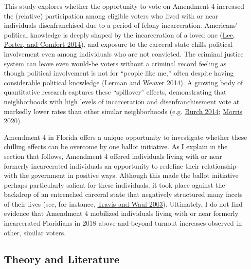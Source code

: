\documentclass[
  12pt,
]{article}
\begin{document}
This study explores whether the opportunity to vote on Amendment 4 increased the (relative) participation among eligible voters who lived with or near individuals disenfranchised due to a period of felony incarceration. Americans' political knowledge is deeply shaped by the incarceration of a loved one (\protect\hyperlink{ref-Lee2014}{Lee, Porter, and Comfort 2014}), and exposure to the carceral state chills political involvement even among individuals who are not convicted. The criminal justice system can leave even would-be voters without a criminal record feeling as though political involvement is not for ``people like me,'' often despite having considerable political knowledge (\protect\hyperlink{ref-Lerman2014}{Lerman and Weaver 2014}). A growing body of quantitative research captures these ``spillover'' effects, demonstrating that neighborhoods with high levels of incarceration and disenfranchisement vote at markedly lower rates than other similar neighborhoods (e.g. \protect\hyperlink{ref-Burch2014}{Burch 2014}; \protect\hyperlink{ref-Morris2020}{Morris 2020}).

Amendment 4 in Florida offers a unique opportunity to investigate whether these chilling effects can be overcome by one ballot initiative. As I explain in the section that follows, Amendment 4 offered individuals living with or near formerly incarcerated individuals an opportunity to redefine their relationship with the government in positive ways. Although this made the ballot initiative perhaps particularly salient for these individuals, it took place against the backdrop of an entrenched carceral state that negatively structured many facets of their lives (see, for instance, \protect\hyperlink{ref-Travis2003}{Travis and Waul 2003}). Ultimately, I do not find evidence that Amendment 4 mobilized individuals living with or near formerly incarcerated Floridians in 2018 above-and-beyond turnout increases observed in other, similar voters.

\hypertarget{theory-and-literature}{%
\subsection*{Theory and Literature}\label{theory-and-literature}}
\end{document}
